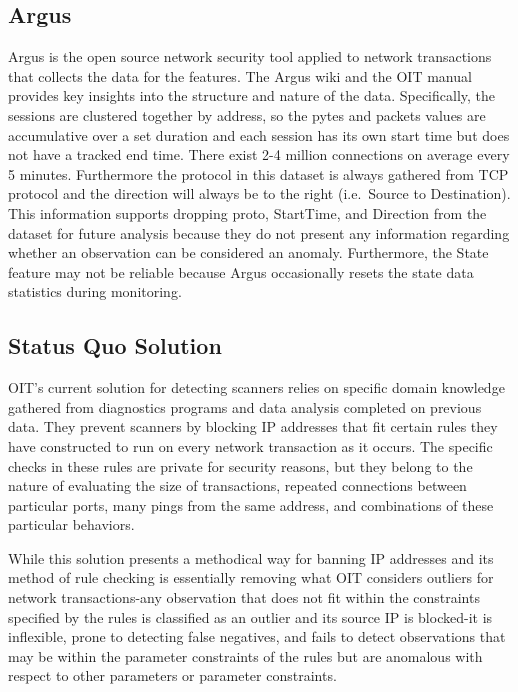 \documentclass[12pt,twoside]{dukestatscithesis}
\theoremstyle{definition}
\theoremstyle{definition}
\theoremstyle{definition}
\theoremstyle{remark}
\begin{document}
\subsection{Argus}\label{argus}

Argus is the open source network security tool applied to network
transactions that collects the data for the features. The Argus wiki and
the OIT manual provides key insights into the structure and nature of
the data. Specifically, the sessions are clustered together by address,
so the pytes and packets values are accumulative over a set duration and
each session has its own start time but does not have a tracked end
time. There exist 2-4 million connections on average every 5 minutes.
Furthermore the protocol in this dataset is always gathered from TCP
protocol and the direction will always be to the right (i.e.~Source to
Destination). This information supports dropping proto, StartTime, and
Direction from the dataset for future analysis because they do not
present any information regarding whether an observation can be
considered an anomaly. Furthermore, the State feature may not be
reliable because Argus occasionally resets the state data statistics
during monitoring.

\subsection{Status Quo Solution}\label{status-quo-solution}

OIT's current solution for detecting scanners relies on specific domain
knowledge gathered from diagnostics programs and data analysis completed
on previous data. They prevent scanners by blocking IP addresses that
fit certain rules they have constructed to run on every network
transaction as it occurs. The specific checks in these rules are private
for security reasons, but they belong to the nature of evaluating the
size of transactions, repeated connections between particular ports,
many pings from the same address, and combinations of these particular
behaviors.

While this solution presents a methodical way for banning IP addresses
and its method of rule checking is essentially removing what OIT
considers outliers for network transactions-any observation that does
not fit within the constraints specified by the rules is classified as
an outlier and its source IP is blocked-it is inflexible, prone to
detecting false negatives, and fails to detect observations that may be
within the parameter constraints of the rules but are anomalous with
respect to other parameters or parameter constraints.
\end{document}
